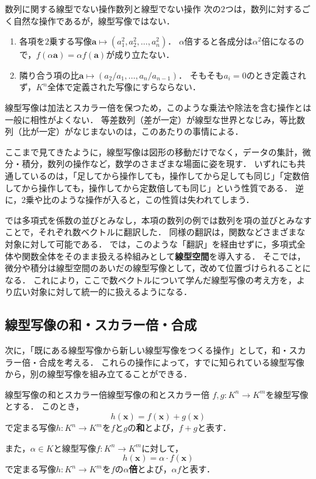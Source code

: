 \begin{example}{数列に関する線型でない操作}{数列と線型でない操作}
次の$2$つは，数列に対するごく自然な操作であるが，線型写像ではない．
\begin{enumerate}[label=(\arabic*),leftmargin=3.2em]
\item 各項を$2$乗する写像$\bm{a} \mapsto (a_1^2, a_2^2, \dots, a_n^2)$．
$\alpha$倍すると各成分は$\alpha^2$倍になるので，$f(\alpha\bm{a}) = \alpha f(\bm{a})$が成り立たない．
\item 隣り合う項の比$\bm{a} \mapsto (a_2/a_1, \dots, a_n/a_{n-1})$．
そもそも$a_i = 0$のとき定義されず，$K^n$全体で定義された写像にすらならない．
\end{enumerate}
線型写像は加法とスカラー倍を保つため，このような乗法や除法を含む操作とは一般に相性がよくない．
等差数列（差が一定）が線型な世界となじみ，等比数列（比が一定）がなじまないのは，このあたりの事情による．
\end{example}

ここまで見てきたように，線型写像は図形の移動だけでなく，データの集計，微分・積分，数列の操作など，数学のさまざまな場面に姿を現す．
いずれにも共通しているのは，「足してから操作しても，操作してから足しても同じ」「定数倍してから操作しても，操作してから定数倍しても同じ」という性質である．
逆に，$2$乗や比のような操作が入ると，この性質は失われてしまう．

\begin{mycolumn}
  では多項式を係数の並びとみなし，本項の数列の例では数列を項の並びとみなすことで，それぞれ数ベクトルに翻訳した．
  同様の翻訳は，関数などさまざまな対象に対して可能である．
  では，このような「翻訳」を経由せずに，多項式全体や関数全体をそのまま扱える枠組みとして\textbf{線型空間}を導入する．
  そこでは，微分や積分は線型空間のあいだの線型写像として，改めて位置づけられることになる．
  これにより，ここで数ベクトルについて学んだ線型写像の考え方を，より広い対象に対して統一的に扱えるようになる．
\end{mycolumn}

\subsection{線型写像の和・スカラー倍・合成}

次に，「既にある線型写像から新しい線型写像をつくる操作」として，和・スカラー倍・合成を考える．
これらの操作によって，すでに知られている線型写像から，別の線型写像を組み立てることができる．

\begin{definition}{線型写像の和とスカラー倍}{線型写像の和とスカラー倍}
  $f, g \colon K^n \to K^m$を線型写像とする．
  このとき，
  \[
    h(\bm{x}) = f(\bm{x}) + g(\bm{x})
  \]
  で定まる写像$h \colon K^n \to K^m$を$f$と$g$の\textbf{和}とよび，$f + g$と表す．

  また，$\alpha \in K$と線型写像$f \colon K^n \to K^m$に対して，
  \[
    h(\bm{x}) = \alpha \cdot f(\bm{x})
  \]
  で定まる写像$h \colon K^n \to K^m$を$f$の\textbf{$\alpha$倍}とよび，$\alpha f$と表す．
\end{definition}


